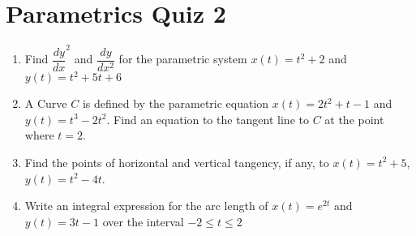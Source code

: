 \documentclass[12pt
]{article}
\author{}
\date{}
\begin{document}
\thispagestyle{empty}
\hypertarget{parametrics-quiz-2}{%
\section{Parametrics Quiz 2}\label{parametrics-quiz-2}}

\begin{enumerate}
\def\labelenumi{\arabic{enumi}.}
\def\itemsep{2in}
\item
  Find \(\dfrac{dy}{dx}^2\) and \(\dfrac{dy}{dx^2}\) for the parametric
  system \(x(t)=t^2+2\) and \(y(t) = t^2+5t+6\)
\item
  A Curve \(C\) is defined by the parametric equation \(x(t) = 2t^2+t-1\)
  and \(y(t) = t^3-2t^2\). Find an equation to the tangent line to \(C\)
  at the point where \(t=2\).
\item
  Find the points of horizontal and vertical tangency, if any, to \(x(t)=t^2+5\),
  \(y(t) = t^2-4t\).
\item
  Write an integral expression for the arc length of \(x(t) = e^{2t}\)
  and \(y(t) = 3t-1\) over the interval \(-2 \leq t \leq 2\)
\end{enumerate}
\end{document}
